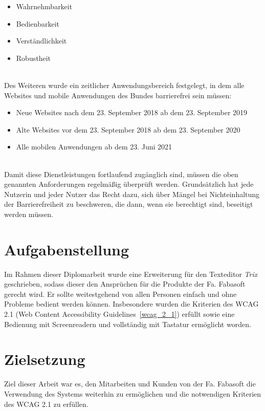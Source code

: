 \begin{itemize}
    \item Wahrnehmbarkeit
    \item Bedienbarkeit
    \item Verständlichkeit
    \item Robustheit
\end{itemize}

\mbox{}\\Des Weiteren wurde ein zeitlicher Anwendungsbereich festgelegt, in dem alle Websites und mobile Anwendungen des Bundes barrierefrei sein müssen:

\begin{itemize}
    \item Neue Websites nach dem 23. September 2018 ab dem 23. September 2019
    \item Alte Websites vor dem 23. September 2018 ab dem 23. September 2020
    \item Alle mobilen Anwendungen ab dem 23. Juni 2021
\end{itemize}

\mbox{}\\Damit diese Dienstleistungen fortlaufend zugänglich sind, müssen die oben genannten Anforderungen regelmäßig überprüft werden. Grundsätzlich hat jede Nutzerin und jeder Nutzer das Recht dazu, sich über Mängel bei Nichteinhaltung der Barrierefreiheit zu beschweren, die dann, wenn sie berechtigt sind, beseitigt werden müssen. 

\section{Aufgabenstellung}
Im Rahmen dieser Diplomarbeit wurde eine Erweiterung für den Texteditor {\em{Trix}} geschrieben, sodass dieser den Ansprüchen für die Produkte der Fa. Fabasoft gerecht wird. Er sollte weitestgehend von allen Personen einfach und ohne Probleme bedient werden können. Insbesondere wurden die Kriterien des WCAG 2.1 (Web Content Accessibility Guidelines~\ref{wcag_2_1}) erfüllt sowie eine Bedienung mit Screenreadern und vollständig mit Tastatur ermöglicht worden.

\section{Zielsetzung}
Ziel dieser Arbeit war es, den Mitarbeiten und Kunden von der Fa. Fabasoft die Verwendung des Systems weiterhin zu ermöglichen und die notwendigen Kriterien des WCAG 2.1 zu erfüllen.

